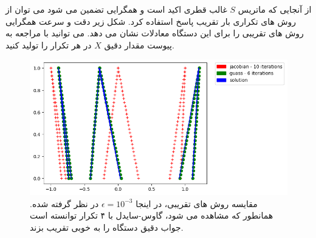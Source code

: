 	از آنجایی که ماتریس $ S $ غالب قطری اکید است و همگرایی تضمین می شود می توان از روش های تکراری بار تقریب پاسخ استفاده کرد. شکل زیر دقت و سرعت همگرایی روش های تقریبی را برای این دستگاه معادلات نشان می دهد. می توانید با مراجعه به پیوست مقدار دقیق $ X $ در هر تکرار را تولید کنید. 
	
		
	\begin{figure}[h]
		\centering 
		\includegraphics[width=0.9\linewidth]{assets/ex_3.png} 
		\caption{مقایسه روش های تقریبی، ‌در اینجا $ \epsilon=10^{-3} $ در نظر گرفته شده. همانطور که مشاهده می شود،‌ گاوس-سایدل با ۴ تکرار توانسته است جواب دقیق دستگاه را به خوبی تقریب بزند.}
	\end{figure} 
	
		
		\pagebreak
		